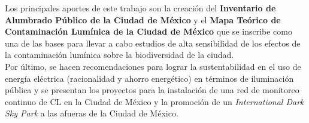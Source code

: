 Los principales aportes de este trabajo son la creación del \textbf{Inventario de Alumbrado Público de la Ciudad de México} y el \textbf{Mapa Teórico de Contaminación Lumínica de la Ciudad de México} que se inscribe como una de las bases para llevar a cabo estudios de alta sensibilidad de los efectos de la contaminación lumínica sobre la biodiversidad de la ciudad.\\

Por último, se hacen recomendaciones para lograr la sustentabilidad en el uso de energía eléctrica (racionalidad y ahorro energético) en términos de iluminación pública y se presentan los proyectos para la instalación de una red de monitoreo continuo de CL en la Ciudad de México y la promoción de un \textit{International Dark Sky Park} a las afueras de la Ciudad de México.\\
